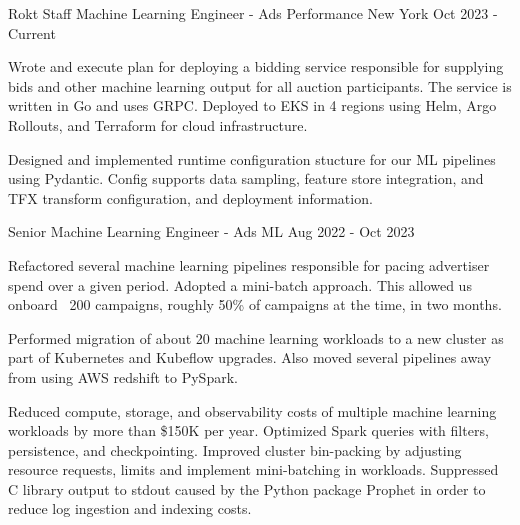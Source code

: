 

\begin{cventries}
\cventrywide
  {Rokt} %
  {Staff Machine Learning Engineer - Ads Performance} %
  {New York} %
  {Oct 2023 - Current} %
  {
    \begin{cvitems} %
      \item {Wrote and execute plan for deploying a bidding service responsible for supplying bids and other machine learning output for all auction participants. The service is written in Go and uses GRPC. Deployed to EKS in 4 regions using Helm, Argo Rollouts, and Terraform for cloud infrastructure. }
      \item {Designed and implemented runtime configuration stucture for our ML pipelines using Pydantic. Config supports data sampling, feature store integration, and TFX transform configuration, and deployment information. }
    \end{cvitems}
  }

\cventrywide
  {Senior Machine Learning Engineer - Ads ML} %
  {}
  {}
  {Aug 2022 - Oct 2023} %
  {
    \begin{cvitems} %
      \item {Refactored several machine learning pipelines responsible for pacing advertiser spend over a given period. Adopted a mini-batch approach. This allowed us onboard ~200 campaigns, roughly 50\% of campaigns at the time, in two months. }
      \item {Performed migration of about 20 machine learning workloads to a new cluster as part of Kubernetes and Kubeflow upgrades. Also moved several pipelines away from using AWS redshift to PySpark. }
      \item {Reduced compute, storage, and observability costs of multiple machine learning workloads by more than \$150K per year. Optimized Spark queries with filters, persistence, and checkpointing. Improved cluster bin-packing by adjusting resource requests, limits and implement mini-batching in workloads. Suppressed C library output to stdout caused by the Python package Prophet in order to reduce log ingestion and indexing costs. }
    \end{cvitems}
  }


\end{cventries}
